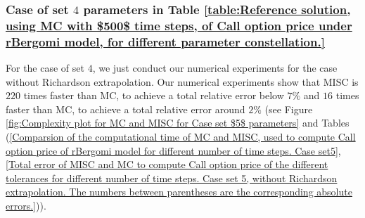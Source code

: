 \subsubsection{Case of set $4$ parameters in Table \ref{table:Reference solution, using MC with $500$ time steps, of Call option price under rBergomi model, for different parameter constellation.}}\label{sec:Case of set 5 parameters}

For the case of set $4$, we just conduct our numerical experiments for the case without Richardson extrapolation. Our numerical experiments show that  MISC is  $220$ times faster than MC, to achieve a total relative error below $7\%$ and $16$ times faster than MC, to achieve a total relative error around $2\%$  (see Figure \ref{fig:Complexity plot for MC and MISC for Case set $5$ parameters} and Tables (\ref{Comparsion of the computational time of  MC and MISC, used to compute Call option price of rBergomi model for different number of time steps. Case set5}, \ref{Total error of MISC and MC to compute Call option price of the different tolerances for different number of time steps. Case set 5, without Richardson extrapolation. The numbers between parentheses are the corresponding absolute errors.})).

%		
%		

